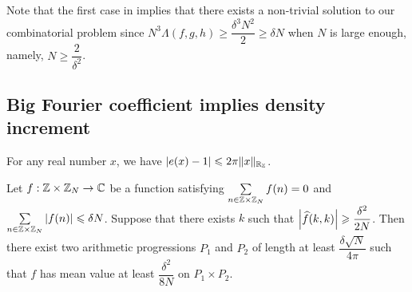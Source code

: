 \noindent Note that the first case in  implies that there exists a non-trivial solution to our combinatorial problem since $ N^3 \Lambda(f,g,h) \geq \dfrac{\delta^3 N^2}{2} \geq \delta N $ when $ N $ is large enough, namely, $ N \geq \dfrac{2}{\delta^2} $.

\subsection{Big Fourier coefficient implies density increment}
\begin{lemma} \label{lem:e-ineq}
	For any real number $ x $, we have $ \left\vert{e(x) - 1}\right\vert \leqslant 2 \pi \| x \|_{{\mathbb R}_{\mathbb Z}}  $.
\end{lemma}

\begin{lemma} \label{lem:density-increment}
	Let $ f : {\mathbb Z} \times {\mathbb Z}_N \rightarrow {\mathbb C} $ be a function satisfying $ \sum\limits_{n \in {\mathbb Z} \times {\mathbb Z}_N} f(n) = 0 $ and $\sum\limits_{n \in {\mathbb Z} \times {\mathbb Z}_N} \left\vert{f(n)}\right\vert \leqslant \delta N $. Suppose that there exists $ k $ such that $ \left\vert{\widehat{f}(k, k)}\right\vert \geqslant \dfrac{\delta^2}{2N} $. Then there exist two arithmetic progressions $ P_1 $ and $ P_2 $ of length at least $ \dfrac{\delta \sqrt{N}}{4\pi} $ such that $ f $ has mean value at least $ \dfrac{\delta^2}{8N} $ on $ P_1 \times P_2 $.
\end{lemma}


